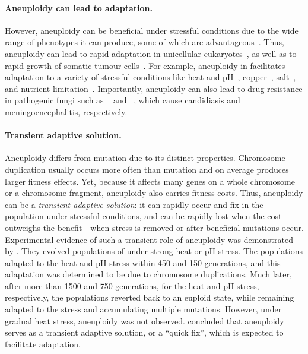 \documentclass[12pt]{extarticle}
\begin{document}
\paragraph*{Aneuploidy can lead to adaptation.}
However, aneuploidy can be beneficial under stressful conditions due to the wide range of phenotypes it can produce, some of which are advantageous~\citep{Pavelka2010}.
Thus, aneuploidy can lead to rapid adaptation in unicellular eukaryotes~\citep{Gerstein2015,Torres2010, Hong2014, Rancati2008}, as well as to rapid growth of somatic tumour cells~\citep{Schvartzman2010, Sheltzer2017}.
For example, aneuploidy in \yeast facilitates adaptation to a variety of stressful conditions like heat and pH~\citep{Yona2012}, copper~\citep{Covo2014, Gerstein2015}, salt~\citep{Dhar2011}, and nutrient limitation~\citep{Dunham2002, Gresham2008}.
Importantly, aneuploidy can also lead to drug resistance in pathogenic fungi such as \calbicans~\citep{Selmecki2008, Selmecki2010, Gerstein2018} and \cneoformans~\citep{Sionov2010}, which cause candidiasis and meningoencephalitis, respectively.

\paragraph*{Transient adaptive solution.} 
Aneuploidy differs from mutation due to its distinct properties. 
Chromosome duplication usually occurs more often than mutation and on average produces larger fitness effects.
Yet, because it affects many genes on a whole chromosome or a chromosome fragment, aneuploidy also carries fitness costs.
Thus, aneuploidy can be a \emph{transient adaptive solution}: it can rapidly occur and fix in the population under stressful conditions, and can be rapidly lost when the cost outweighs the benefit---when stress is removed or after beneficial mutations occur.
Experimental evidence of such a transient role of aneuploidy was demonstrated by \citet{Yona2012}. They evolved populations of \yeast under strong heat or pH stress.
The populations adapted to the heat and pH stress within 450 and 150 generations, and this adaptation was determined to be due to chromosome duplications.
Much later, after more than 1500 and 750 generations, for the heat and pH stress, respectively, the populations reverted back to an euploid state, while remaining adapted to the stress and accumulating multiple mutations.
However, under gradual heat stress, aneuploidy was not observed.
\citet{Yona2012} concluded that aneuploidy serves as a transient adaptive solution, or a ``quick fix'', which is expected to facilitate adaptation. 
\end{document}
